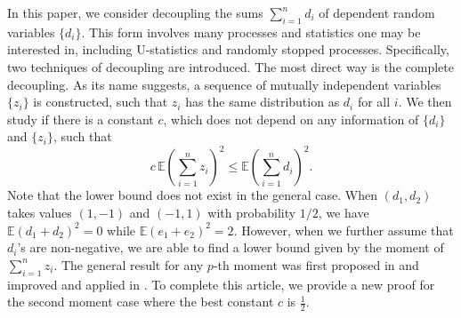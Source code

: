 \documentclass[ECP]{ejpecp} %
\newcommand{\lpar}{\left(}
\newcommand{\rpar}{\right)}
\newcommand{\E}{\mathbb{E}}
\newcommand{\sumn}{\sum\limits_{i=1}^n}
\begin{document}
In this paper, we consider decoupling the sums $\sumn d_i$ of dependent random variables $\{d_i\}$. This form involves many processes and statistics one may be interested in, including U-statistics and randomly stopped processes. Specifically, two techniques of decoupling are introduced. The most direct way is the complete decoupling. As its name suggests, a sequence of mutually independent variables $\{z_i\}$ is constructed, such that $z_i$ has the same distribution as $d_i$ for all $i$. We then study if there is a constant $c$, which does not depend on any information of $\{d_i\}$ and $\{z_i\}$, such that 
\[ c\,\E  \lpar  \sumn z_i\rpar^2 \leq\E  \lpar  \sumn d_i\rpar^2.\]
Note that the lower bound does not exist in the general case. When $(d_1, d_2) $ takes values $(1,-1)$ and $(-1,1)$ with probability $1/2$, we have $\E(d_1+d_2)^2 = 0$ while $\E(e_1+e_2)^2 = 2$.  However, when we further assume that $d_i$'s are non-negative, we are able to find a lower bound given by the moment of $\sumn z_i$. The general result for any $p$-th moment was first proposed in \cite{de1990bounds} and improved and applied in \cite{makarychev2018solving}. To complete this article, we provide a new proof for the second moment case where the best constant $c$ is $\frac{1}{2}$. 
 
\end{document}

